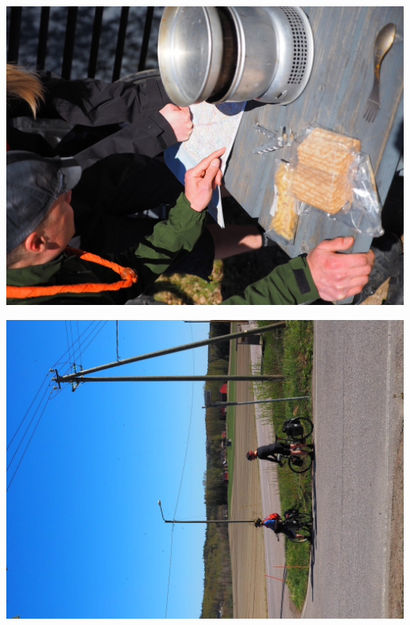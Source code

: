 \begin{multicols}{2}
	\begin{center}
		\noindent\includegraphics[height=0.36\paperheight]{assets/pyörävaellus20}
	\end{center}
	\columnbreak
	\begin{Figure}
		\noindent\includegraphics[height=0.36\paperheight]{assets/pyörävaellus21}
	\end{Figure}
\end{multicols}


